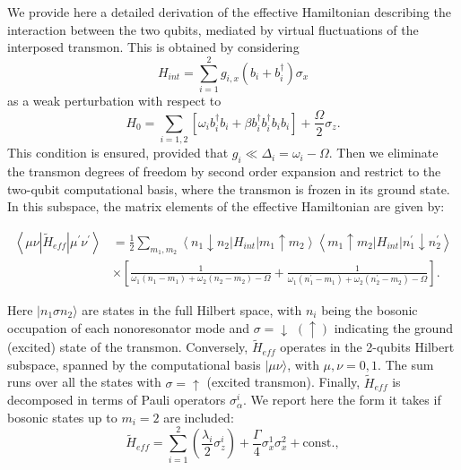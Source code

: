 \documentclass[aps,twocolumn,groupedaddress,superscriptaddress,floatfix,amsmath,amssymb,prb]{revtex4-1}
\begin{document}
We provide here a detailed derivation of the effective Hamiltonian describing the interaction between the two qubits, mediated by virtual fluctuations of the interposed transmon. 
This is obtained by considering 
\begin{equation}
H_{int} = \sum_{i=1}^2 g_{i,x} \left(b_i+b_i^\dagger\right)\sigma_x 
\end{equation}
as a weak perturbation with respect to
\begin{equation}
H_{0} = \sum_{i=1,2} \left[ \omega_i b^\dagger_i b_i + \beta b^\dagger_i b^\dagger_i b_i b_i \right] +  \frac{\Omega} {2}\sigma_z .
\end{equation}
This condition is ensured, provided that $g_i \ll \Delta_i = \omega_i-\Omega$. Then we eliminate the transmon degrees of freedom by second order expansion and restrict to the two-qubit computational basis, where the transmon is frozen in its ground state. 
In this subspace, the matrix elements of the effective Hamiltonian are given by:
\begin{widetext}
\begin{equation}
\begin{split}
\left\langle \mu \nu | \tilde{H}_{eff} | \mu^\prime  \nu^\prime \right\rangle & = \frac{1}{2}\sum_{m_1,m_2} \left\langle n_1 \downarrow n_2 | H_{int} | m_1 \uparrow m_2 \right\rangle \left\langle m_1 \uparrow m_2 | H_{int} | n_1^\prime \downarrow n_2^\prime \right\rangle  \\
& \times \left[ \frac{1}{\omega_1 (n_1-m_1) + \omega_2 (n_2-m_2)- \Omega} + \frac{1}{\omega_1 (n_1^\prime-m_1) + \omega_2 (n_2^\prime-m_2)-\Omega }  \right].
\end{split}
\end{equation}
\end{widetext}
Here $| n_1 \sigma n_2 \rangle $ are states in the full Hilbert space, with $n_i$ being the bosonic occupation of each nonoresonator mode and $\sigma = \downarrow$ $(\uparrow)$ indicating the ground (excited) state of the transmon. 
Conversely, $\tilde{H}_{eff}$ operates in the 2-qubits Hilbert subspace, spanned by the computational basis $|\mu \nu\rangle$, with $\mu,\nu = 0,1$. 
The sum runs over all the states with $\sigma = \uparrow$ (excited transmon). Finally, $\tilde{H}_{eff}$ is decomposed in terms of Pauli operators $\sigma_\alpha^i$. 
We report here the form it takes if bosonic states up to $m_i=2$ are included:
\begin{equation}
\tilde{H}_{eff} = \sum_{i=1}^2 \left(\frac{\lambda_i}{2}\sigma^i_{z}\right) + \frac{\Gamma}{4} \sigma^1_x\sigma^2_x + \text{const.}, 
\label{Heff}
\end{equation}
\end{document}
